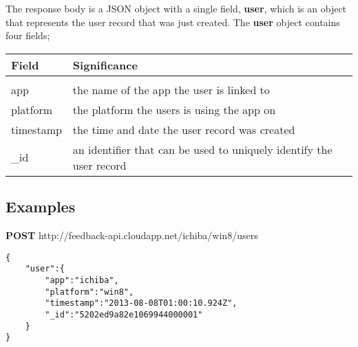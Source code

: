 The response body is a JSON object with a single field, \textbf{user},
which is an object that represents the user record that was just created.
The \textbf{user} object contains four fields;
\begin{center}
\begin{tabular}{l|l}
\textbf{Field} & \textbf{Significance} \\
\hline \\

app & the name of the app the user is linked to \\
platform & the platform the users is using the app on \\
timestamp & the time and date the user record was created \\
\_id & an identifier that can be used to uniquely identify the user record

\end{tabular}
\end{center}

\subsection{Examples}

\textbf{POST} http://feedback-api.cloudapp.net/ichiba/win8/users
\begin{verbatim}
{
    "user":{
        "app":"ichiba",
        "platform":"win8",
        "timestamp":"2013-08-08T01:00:10.924Z",
        "_id":"5202ed9a82e1069944000001"
    }
}
\end{verbatim}
